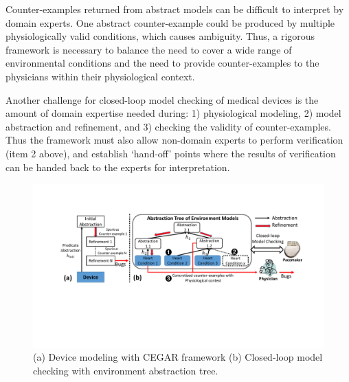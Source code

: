 Counter-examples returned from abstract models can be difficult to interpret by domain experts.
One abstract counter-example could be produced by multiple physiologically valid conditions, which causes ambiguity.
Thus, a rigorous framework is necessary to balance the need to cover a wide range of environmental conditions and the need to provide counter-examples to the physicians within their physiological context.

Another challenge for closed-loop model checking of medical devices is the amount of domain expertise needed during: 1) physiological modeling, 2) model abstraction and refinement, and 3) checking the validity of counter-examples.
Thus the framework must also allow non-domain experts to perform verification (item 2 above),
and establish `hand-off' points where the results of verification can be handed back 
to the experts for interpretation.

\begin{figure}[!t]
		\centering
		\includegraphics[width=\textwidth]{figs/distinction.pdf}
		\caption{\small (a) Device modeling with CEGAR framework (b) Closed-loop model checking with environment abstraction tree.}%
		\label{fig:distinction}
\end{figure}

